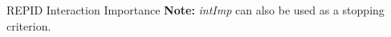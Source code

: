 \documentclass[10pt,compress,t,notes=noshow,xcolor=table]{beamer}
\begin{document}
\begin{framev}[align=top]{REPID Interaction Importance}
{\spacer[0.25]
\textbf{Note:} \textit{intImp} can also be used as a stopping criterion.\\
}
\end{framev}
\end{document}
